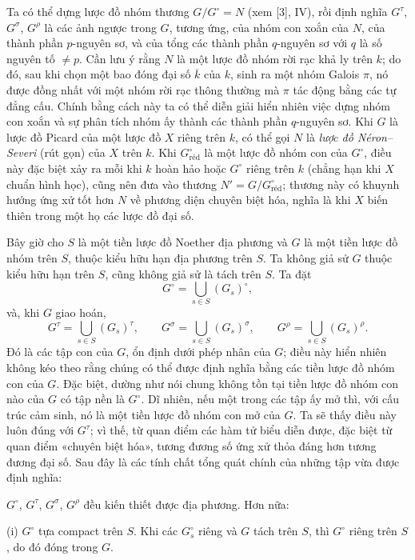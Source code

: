  Ta có thể dựng lược đồ nhóm thương
$G/G^\circ=N$ (xem [3], IV), rồi định nghĩa $G^\tau$, $G^\sigma$, $G^\rho$
là các ảnh ngược trong $G$, tương ứng, của nhóm con xoắn của $N$, của thành
phần $p$-nguyên sơ, và của tổng các thành phần $q$-nguyên sơ với $q$ là số
nguyên tố $\neq p$. Cần lưu ý rằng $N$ là một lược đồ nhóm rời rạc khả ly trên
$k$; do đó, sau khi chọn một bao đóng đại số $\overline k$ của $k$, sinh ra
một nhóm Galois $\pi$, nó được đồng nhất với một nhóm rời rạc thông thường mà
$\pi$ tác động bằng các tự đẳng cấu. Chính bằng cách này ta có thể diễn giải
hiển nhiên việc dựng nhóm con xoắn và sự phân tích nhóm ấy thành các thành
phần $q$-nguyên sơ. Khi $G$ là lược đồ Picard của một lược đồ $X$ riêng trên
$k$, có thể gọi $N$ là \emph{lược đồ Néron--Severi} (rút gọn) của $X$ trên
$k$. Khi $G^\circ_{\mathrm{réd}}$ là một lược đồ nhóm con của $G^\circ$, điều
này đặc biệt xảy ra mỗi khi $k$ hoàn hảo hoặc $G^\circ$ riêng trên $k$ (chẳng
hạn khi $X$ chuẩn hình học), cũng nên đưa vào thương
$N'=G/G^\circ_{\mathrm{réd}}$; thương này có khuynh hướng ứng xử tốt hơn $N$
về phương diện chuyên biệt hóa, nghĩa là khi $X$ biến thiên trong một họ các
lược đồ đại số.

Bây giờ cho $S$ là một tiền lược đồ Noether địa phương và $G$ là một tiền
lược đồ nhóm trên $S$, thuộc kiểu hữu hạn địa phương trên $S$. Ta không giả
sử $G$ thuộc kiểu hữu hạn trên $S$, cũng không giả sử là tách trên $S$. Ta
đặt
\[
G^\circ=\bigcup_{s\in S}(G_s)^\circ,
\]
và, khi $G$ giao hoán,
\[
G^\tau=\bigcup_{s\in S}(G_s)^\tau,
\qquad
G^\sigma=\bigcup_{s\in S}(G_s)^\sigma,
\qquad
G^\rho=\bigcup_{s\in S}(G_s)^\rho.
\]
Đó là các tập con của $G$, ổn định dưới phép nhân của $G$; điều này hiển nhiên
không kéo theo rằng chúng có thể được định nghĩa bằng các tiền lược đồ nhóm
con của $G$. Đặc biệt, dường như nói chung không tồn tại tiền lược đồ nhóm
con nào của $G$ có tập nền là $G^\circ$. Dĩ nhiên, nếu một trong các tập ấy
mở thì, với cấu trúc cảm sinh, nó là một tiền lược đồ nhóm con mở của $G$. Ta
sẽ thấy điều này luôn đúng với $G^\tau$; vì thế, từ quan điểm các hàm tử biểu
diễn được, đặc biệt từ quan điểm «chuyên biệt hóa», tương đương số ứng xử thỏa
đáng hơn tương đương đại số. Sau đây là các tính chất tổng quát chính của
những tập vừa được định nghĩa:

 $G^\circ$, $G^\tau$, $G^\sigma$, $G^\rho$ đều kiến
thiết được địa phương. Hơn nữa:

\noindent (i) $G^\circ$ tựa compact trên $S$. Khi các $G_s^\circ$ riêng và
$G$ tách trên $S$, thì $G^\circ$ riêng trên $S$, do đó đóng trong $G$.

